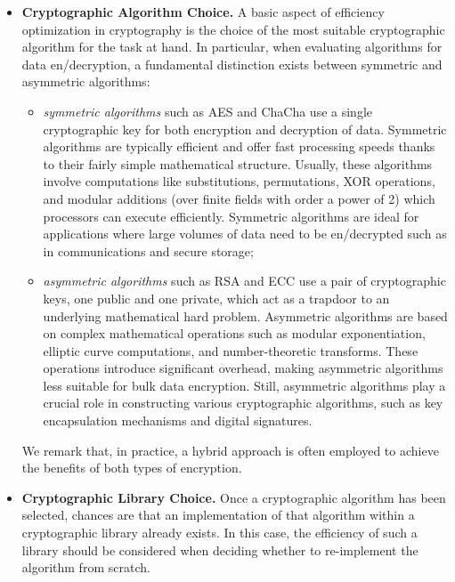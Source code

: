 \begin{itemize}
	
	\item \textbf{Cryptographic Algorithm Choice.} A basic aspect of efficiency optimization in cryptography is the choice of the most suitable cryptographic algorithm for the task at hand. In particular, when evaluating algorithms for data en/decryption, a fundamental distinction exists between symmetric and asymmetric algorithms:
	
	\begin{itemize}
		
		\item \textit{symmetric algorithms} such as AES and ChaCha use a single cryptographic key for both encryption and decryption of data. Symmetric algorithms are typically efficient and offer fast processing speeds thanks to their fairly simple mathematical structure. Usually, these algorithms involve computations like substitutions, permutations, XOR operations, and modular additions (over finite fields with order a power of 2) which processors can execute efficiently. Symmetric algorithms are ideal for applications where large volumes of data need to be en/decrypted such as in communications and secure storage;
		
		\item \textit{asymmetric algorithms} such as RSA and ECC use a pair of cryptographic keys, one public and one private, which act as a trapdoor to an underlying mathematical hard problem. Asymmetric algorithms are based on complex mathematical operations such as modular exponentiation, elliptic curve computations, and number-theoretic transforms. These operations introduce significant overhead, making asymmetric algorithms less suitable for bulk data encryption. Still, asymmetric algorithms play a crucial role in constructing various cryptographic algorithms, such as key encapsulation mechanisms and digital signatures.
		
	\end{itemize}
	
	We remark that, in practice, a hybrid approach is often employed to achieve the benefits of both types of encryption. 
	
	\item \textbf{Cryptographic Library Choice.} Once a cryptographic algorithm has been selected, chances are that an implementation of that algorithm within a cryptographic library already exists. In this case, the efficiency of such a library should be considered when deciding whether to re-implement the algorithm from scratch.
	

\end{itemize}
